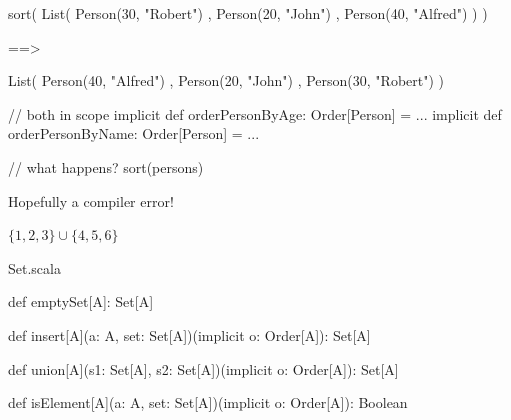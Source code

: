 \documentclass[usenames,dvipsnames,svgnames,table,aspectratio=169,mathserif]{beamer}
\newcommand{\nl}{\vspace{\baselineskip}}
\newcommand{\pnl}{\pause \nl}
\begin{document}
\begin{frame}[fragile]
\begin{scalacode}
sort(
  List(
    Person(30, "Robert")
  , Person(20, "John")
  , Person(40, "Alfred")
  )
)
\end{scalacode}

\pnl

\begin{scalacode}
==>

List(
  Person(40, "Alfred")
, Person(20, "John")
, Person(30, "Robert")
)

\end{scalacode}
\end{frame}


\begin{frame}[fragile]
\begin{scalacode}
// both in scope
implicit def orderPersonByAge: Order[Person] = ...
implicit def orderPersonByName: Order[Person] = ...

// what happens?
sort(persons)
\end{scalacode}

\pnl

Hopefully a compiler error!
\end{frame}


\begin{frame}
\begin{Huge}
\begin{center}
$\{1,2,3\} \cup \{4,5,6\}$
\end{center}
\end{Huge}
\end{frame}


\begin{frame}[fragile]
\begin{block}{Set.scala}
\begin{scalacode}
def emptySet[A]: Set[A]

def insert[A](a: A, set: Set[A])(implicit o: Order[A]): Set[A]

def union[A](s1: Set[A], s2: Set[A])(implicit o: Order[A]): Set[A]

def isElement[A](a: A, set: Set[A])(implicit o: Order[A]): Boolean
\end{scalacode}
\end{block}
\end{frame}
\end{document}
